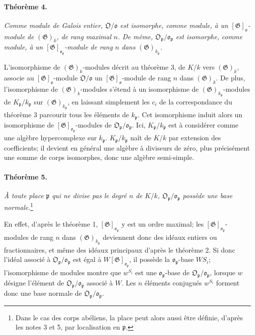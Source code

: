 \paragraph{Théorème 4.}
\emph{Comme module de Galois entier, \(\mathfrak{O}/\mathfrak{o}\) est isomorphe, comme module, à un \([\mathfrak{G}]_{\mathfrak{o}}\)-module de \((\mathfrak{G})_k\), de rang maximal \(n\). De même, \(\mathfrak{O}_{\mathfrak{p}}/\mathfrak{o}_{\mathfrak{p}}\) est isomorphe, comme module, à un \([\mathfrak{G}]_{\mathfrak{o}_{\mathfrak{p}}}\)-module de rang \(n\) dans \((\mathfrak{G})_{k_{\mathfrak{p}}}\).}

L'isomorphisme de \((\mathfrak{G})_k\)-modules décrit au théorème 3, de \(K/k\) vers \((\mathfrak{G})_k\), associe au \([\mathfrak{G}]_{\mathfrak{o}}\)-module \(\mathfrak{O}/\mathfrak{o}\) un \([\mathfrak{G}]_{\mathfrak{o}}\)-module de rang \(n\) dans \((\mathfrak{G})_k\). De plus, l'isomorphisme de \((\mathfrak{G})_k\)-modules s'étend à un isomorphisme de \((\mathfrak{G})_{k_{\mathfrak{p}}}\)-modules de \(K_{\mathfrak{p}}/k_{\mathfrak{p}}\) sur \((\mathfrak{G})_{k_{\mathfrak{p}}}\), en laissant simplement les \(c_i\) de la correspondance du théorème 3 parcourir tous les éléments de \(k_{\mathfrak{p}}\). Cet isomorphisme induit alors un isomorphisme de \([\mathfrak{G}]_{\mathfrak{o}_{\mathfrak{p}}}\)-modules de \(\mathfrak{O}_{\mathfrak{p}}/\mathfrak{o}_{\mathfrak{p}}\). Ici, \(K_{\mathfrak{p}}/k_{\mathfrak{p}}\) est à considérer comme une algèbre hypercomplexe sur \(k_{\mathfrak{p}}\). \(K_{\mathfrak{p}}/k_{\mathfrak{p}}\) naît de \(K/k\) par extension des coefficients; il devient en général une algèbre à diviseurs de zéro, plus précisément une somme de corps isomorphes, donc une algèbre semi-simple.

\paragraph{Théorème 5.}
\emph{À toute place \(\mathfrak{p}\) qui ne divise pas le degré \(n\) de \(K/k\), \(\mathfrak{O}_{\mathfrak{p}}/\mathfrak{o}_{\mathfrak{p}}\) possède une base normale.}\footnote{Dans le cas des corps abéliens, la place peut alors aussi être définie, d'après les notes 3 et 5, par localisation en \(\mathfrak{p}\).}

En effet, d'après le théorème 1, \([\mathfrak{G}]_{\mathfrak{o}_{\mathfrak{p}}}\) y est un ordre maximal; les \([\mathfrak{G}]_{\mathfrak{o}_{\mathfrak{p}}}\)-modules de rang \(n\) dans \((\mathfrak{G})_{k_{\mathfrak{p}}}\) deviennent donc des idéaux entiers ou fractionnaires, et même des idéaux principaux d'après le théorème 2. Si donc l'idéal associé à \(\mathfrak{O}_{\mathfrak{p}}/\mathfrak{o}_{\mathfrak{p}}\) est égal à \(W[\mathfrak{G}]_{\mathfrak{o}_{\mathfrak{p}}}\), il possède la \(\mathfrak{o}_{\mathfrak{p}}\)-base \(WS_i\); l'isomorphisme de modules montre que \(w^{S_i}\) est une \(\mathfrak{o}_{\mathfrak{p}}\)-base de \(\mathfrak{O}_{\mathfrak{p}}/\mathfrak{o}_{\mathfrak{p}}\), lorsque \(w\) désigne l'élément de \(\mathfrak{O}_{\mathfrak{p}}/\mathfrak{o}_{\mathfrak{p}}\) associé à \(W\). Les \(n\) éléments conjugués \(w^{S_i}\) forment donc une base normale de \(\mathfrak{O}_{\mathfrak{p}}/\mathfrak{o}_{\mathfrak{p}}\).

